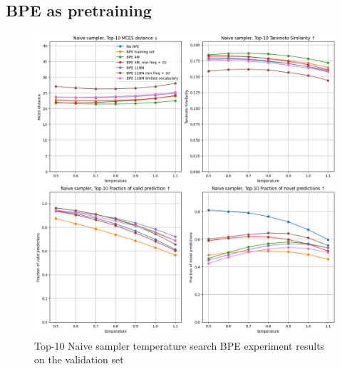 \subsection*{BPE as pretraining}
\begin{figure}[h!]
    \centering
    \includegraphics[width=1.0\textwidth]{figures/appendix/bpe_with_tanimoto.png}
    \caption{Top-10 Naive sampler temperature search BPE experiment results on the validation set}
    \label{fig:bpe_appendix}
\end{figure}

